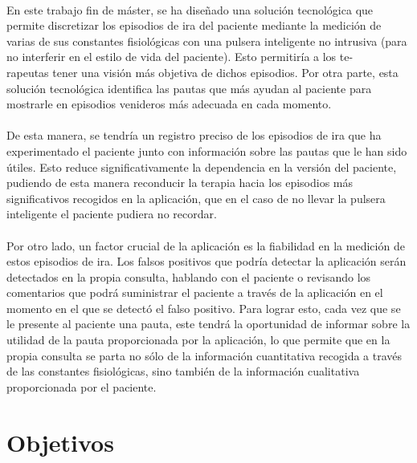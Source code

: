 \paragraph{}
En este trabajo fin de máster, se ha diseñado una solución tecnológica que permite discretizar los episodios de ira del paciente mediante la medición de varias de sus constantes fisiológicas con una pulsera inteligente no intrusiva (para no interferir en el estilo de vida del paciente). Esto permitiría a los te-\\rapeutas tener una visión más objetiva de dichos episodios. Por otra parte, esta solución tecnológica identifica las pautas que más ayudan al paciente para mostrarle en episodios venideros más adecuada en cada momento.

\paragraph{}
De esta manera, se tendría un registro preciso de los episodios de ira que ha experimentado el paciente junto con información sobre las pautas que le han sido útiles. Esto reduce significativamente la dependencia en la versión del paciente, pudiendo de esta manera reconducir la terapia hacia los episodios más significativos recogidos en la aplicación, que en el caso de no llevar la pulsera inteligente el paciente pudiera no recordar.

\paragraph{}
Por otro lado, un factor crucial de la aplicación es la fiabilidad en la medición de estos episodios de ira. Los falsos positivos que podría detectar la aplicación serán detectados en la propia consulta, hablando con el paciente o revisando los comentarios que podrá suministrar el paciente a través de la aplicación en el momento en el que se detectó el falso positivo. Para lograr esto, cada vez que se le presente al paciente una pauta, este tendrá la oportunidad de informar sobre la utilidad de la pauta proporcionada por la aplicación, lo que permite que en la propia consulta se parta no sólo de la información cuantitativa recogida a través de las constantes fisiológicas, sino también de la información cualitativa proporcionada por el paciente.


\section{Objetivos}
\label{sec:objetivos}

